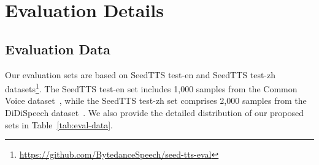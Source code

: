 \documentclass[11pt]{article}
\begin{document}
\section{Evaluation Details}\label{sec:appendix-eval}

\subsection{Evaluation Data}\label{sec:appendix-eval-data}

Our evaluation sets are based on SeedTTS test-en and SeedTTS test-zh datasets\footnote{\href{https://github.com/BytedanceSpeech/seed-tts-eval}{https://github.com/BytedanceSpeech/seed-tts-eval}}. The SeedTTS test-en set includes 1,000 samples from the Common Voice dataset~\cite{ardila2019common}, while the SeedTTS test-zh set comprises 2,000 samples from the DiDiSpeech dataset~\cite{guo2021didispeech}.
We also provide the detailed distribution of our proposed sets in Table~\ref{tab:eval-data}.
\end{document}
